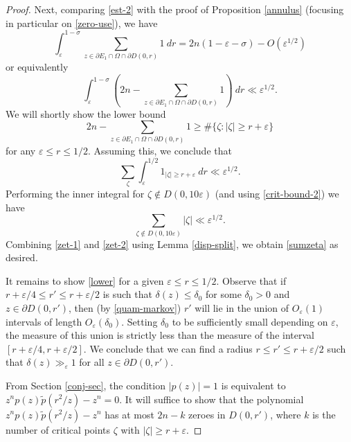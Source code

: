 \documentclass[12pt]{amsart}
\newcommand{\eps}{\varepsilon}
\begin{document}
\begin{proof}
Next, comparing \eqref{est-2} with the proof of Proposition \ref{annulus} (focusing in particular on \eqref{zero-use}), we have
$$ \int_{\eps}^{1-\sigma} \sum_{z \in \partial E_1 \cap \Omega \cap \partial D(0,r)} 1 \ dr = 2n(1-\eps-\sigma) - O(\eps^{1/2})$$
or equivalently
$$ \int_{\eps}^{1-\sigma} \left(2n - \sum_{z \in \partial E_1 \cap \Omega \cap \partial D(0,r)} 1 \right) \ dr \ll \eps^{1/2}.$$
We will shortly show the lower bound
\begin{equation}\label{lower}
 2n - \sum_{z \in \partial E_1 \cap \Omega \cap \partial D(0,r)} 1  \geq \# \{ \zeta: |\zeta| \geq r + \eps \}
\end{equation}
for any $\eps \leq r \leq 1/2$.  Assuming this, we conclude that
$$ \sum_\zeta \int_{\eps}^{1/2} 1_{|\zeta| \geq r + \eps}\ dr \ll \eps^{1/2}.$$
Performing the inner integral for $\zeta \notin D(0,10\eps)$ (and using \eqref{crit-bound-2}) we have
\begin{equation}\label{zet-2}
     \sum_{\zeta\notin D(0,10\eps)} |\zeta| \ll \eps^{1/2}.
\end{equation}
Combining \eqref{zet-1} and \eqref{zet-2}  using Lemma \ref{disp-split}, we obtain \eqref{sumzeta} as desired.

It remains to show \eqref{lower} for a given $\eps \leq r \leq 1/2$. Observe that if $r+\eps/4 \leq r' \leq r+\eps/2$ is such that $\delta(z) \leq \delta_0$ for some $\delta_0 > 0$ and $z \in \partial D(0,r')$, then (by \eqref{quam-markov}) $r'$ will lie in the union of $O_\eps(1)$ intervals of length $O_\eps(\delta_0)$.  Setting $\delta_0$ to be sufficiently small depending on $\eps$, the measure of this union is strictly less than the measure of the interval $[r+\eps/4, r+\eps/2]$.  We conclude that we can find a radius $r \leq r' \leq r+\eps/2$ such that $\delta(z) \gg_\eps 1$ for all $z \in \partial D(0,r')$.

From Section \ref{conj-sec}, the condition $|p(z)| = 1$ is equivalent to $z^n p(z) \tilde p(r^2/z) - z^n = 0$.  It will suffice to show that the polynomial $z^n p(z) \tilde p(r^2/z) - z^n$ has at most $2n - k$ zeroes in $D(0,r')$, where $k$ is the number of critical points $\zeta$ with $|\zeta| \geq r + \eps$.


\end{proof}
\end{document}
